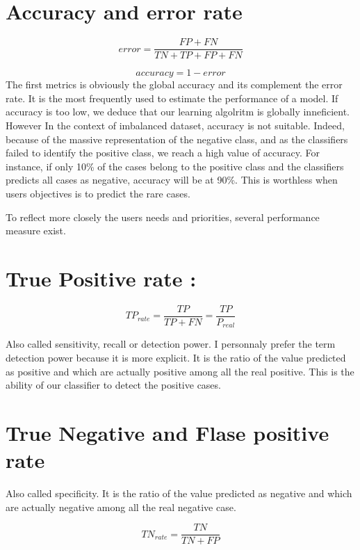 \documentclass[
]{book}
\begin{document}
\hypertarget{accuracy-and-error-rate}{%
\section{Accuracy and error rate}\label{accuracy-and-error-rate}}

\[error = \frac{FP + FN}{TN+TP+FP+FN}\]

\[accuracy = 1 - error\]
The first metrics is obviously the global accuracy and its complement the error rate. It is the most frequently used to estimate the performance of a model. If accuracy is too low, we deduce that our learning algolritm is globally inneficient. However In the context of imbalanced dataset, accuracy is not suitable. Indeed, because of the massive representation of the negative class, and as the classifiers failed to identify the positive class, we reach a high value of accuracy. For instance, if only 10\% of the cases belong to the positive class and the classifiers predicts all cases as negative, accuracy will be at 90\%.
This is worthless when users objectives is to predict the rare cases.

To reflect more closely the users needs and priorities, several performance measure exist.

\hypertarget{true-positive-rate}{%
\section{True Positive rate :}\label{true-positive-rate}}

\[TP_{rate} = \frac{TP}{TP+FN} = \frac{TP}{P_{real}}\]

Also called sensitivity, recall or detection power. I personnaly prefer the term detection power because it is more explicit. It is the ratio of the value predicted as positive and which are actually positive among all the real positive. This is the ability of our classifier to detect the positive cases.

\hypertarget{true-negative-and-flase-positive-rate}{%
\section{True Negative and Flase positive rate}\label{true-negative-and-flase-positive-rate}}

Also called specificity. It is the ratio of the value predicted as negative and which are actually negative among all the real negative case.

\[TN_{rate} = \frac{TN}{TN+FP}\]
\end{document}
